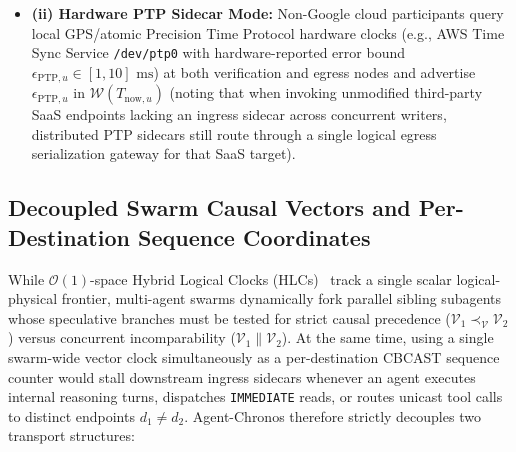 \documentclass[conference,10pt]{IEEEtran}
\begin{document}
\begin{itemize}
    \item \textbf{(ii) Hardware PTP Sidecar Mode:} Non-Google cloud participants query local GPS/atomic Precision Time Protocol hardware clocks (e.g., AWS Time Sync Service \texttt{/dev/ptp0} with hardware-reported error bound $\epsilon_{\text{PTP},u} \in [1, 10]\text{ ms}$) at both verification and egress nodes and advertise $\epsilon_{\text{PTP},u}$ in $\mathcal{W}(T_{\text{now},u})$ (noting that when invoking unmodified third-party SaaS endpoints lacking an ingress sidecar across concurrent writers, distributed PTP sidecars still route through a single logical egress serialization gateway for that SaaS target).
\end{itemize}

\subsection{Decoupled Swarm Causal Vectors and Per-Destination Sequence Coordinates}
While $\mathcal{O}(1)$-space Hybrid Logical Clocks (HLCs)~\cite{kulkarni2014hlc} track a single scalar logical-physical frontier, multi-agent swarms dynamically fork parallel sibling subagents whose speculative branches must be tested for strict causal precedence ($\mathcal{V}_1 \prec_{\mathcal{V}} \mathcal{V}_2$) versus concurrent incomparability ($\mathcal{V}_1 \parallel \mathcal{V}_2$). At the same time, using a single swarm-wide vector clock simultaneously as a per-destination CBCAST sequence counter would stall downstream ingress sidecars whenever an agent executes internal reasoning turns, dispatches \texttt{IMMEDIATE} reads, or routes unicast tool calls to distinct endpoints $d_1 \ne d_2$. Agent-Chronos therefore strictly decouples two transport structures:
\end{document}
